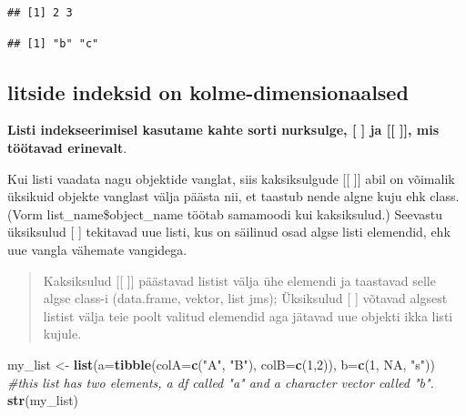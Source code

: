 \documentclass[]{book}
\newenvironment{Shaded}{\begin{snugshade}}{\end{snugshade}}
\newcommand{\KeywordTok}[1]{\textcolor[rgb]{0.13,0.29,0.53}{\textbf{#1}}}
\newcommand{\DataTypeTok}[1]{\textcolor[rgb]{0.13,0.29,0.53}{#1}}
\newcommand{\DecValTok}[1]{\textcolor[rgb]{0.00,0.00,0.81}{#1}}
\newcommand{\StringTok}[1]{\textcolor[rgb]{0.31,0.60,0.02}{#1}}
\newcommand{\CommentTok}[1]{\textcolor[rgb]{0.56,0.35,0.01}{\textit{#1}}}
\newcommand{\OtherTok}[1]{\textcolor[rgb]{0.56,0.35,0.01}{#1}}
\newcommand{\OperatorTok}[1]{\textcolor[rgb]{0.81,0.36,0.00}{\textbf{#1}}}
\newcommand{\NormalTok}[1]{#1}
\begin{document}
\begin{verbatim}
## [1] 2 3
\end{verbatim}

\begin{Shaded}
\end{Shaded}

\begin{verbatim}
## [1] "b" "c"
\end{verbatim}

\subsection{litside indeksid on
kolme-dimensionaalsed}\label{litside-indeksid-on-kolme-dimensionaalsed}

\textbf{Listi indekseerimisel kasutame kahte sorti nurksulge, {[} {]} ja
{[}{[} {]}{]}, mis töötavad erinevalt}.

Kui listi vaadata nagu objektide vanglat, siis kaksiksulgude {[}{[}
{]}{]} abil on võimalik üksikuid objekte vanglast välja päästa nii, et
taastub nende algne kuju ehk class. (Vorm list\_name\$object\_name
töötab samamoodi kui kaksiksulud.) Seevastu üksiksulud {[} {]} tekitavad
uue listi, kus on säilinud osad algse listi elemendid, ehk uue vangla
vähemate vangidega.

\begin{quote}
Kaksiksulud {[}{[} {]}{]} päästavad listist välja ühe elemendi ja
taastavad selle algse class-i (data.frame, vektor, list jms); Üksiksulud
{[} {]} võtavad algsest listist välja teie poolt valitud elemendid aga
jätavad uue objekti ikka listi kujule.
\end{quote}

\begin{Shaded}
\begin{Highlighting}[]
\NormalTok{my_list <-}\StringTok{ }\KeywordTok{list}\NormalTok{(}\DataTypeTok{a=}\KeywordTok{tibble}\NormalTok{(}\DataTypeTok{colA=}\KeywordTok{c}\NormalTok{(}\StringTok{"A"}\NormalTok{, }\StringTok{"B"}\NormalTok{), }\DataTypeTok{colB=}\KeywordTok{c}\NormalTok{(}\DecValTok{1}\NormalTok{,}\DecValTok{2}\NormalTok{)), }\DataTypeTok{b=}\KeywordTok{c}\NormalTok{(}\DecValTok{1}\NormalTok{, }\OtherTok{NA}\NormalTok{, }\StringTok{"s"}\NormalTok{))}
\CommentTok{#this list has two elements, a df called "a" and a character vector called "b".}
\KeywordTok{str}\NormalTok{(my_list)}
\end{Highlighting}
\end{Shaded}
\end{document}

